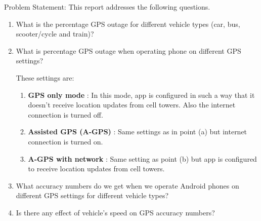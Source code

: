 \documentclass[12pt]{report}
\begin{document}
  



\noindent
Problem Statement: This report addresses the following questions.

\begin{enumerate}
\item \label{q1} What is the percentage GPS outage for different vehicle types
  (car, bus, scooter/cycle and train)?

\item What is percentage GPS outage when operating phone on different GPS
  settings?

  These settings are:
  \begin{enumerate}
  \item \textbf{GPS only mode} : In this mode, app is configured in such a way
    that it doesn't receive location updates from cell towers. Also the internet
    connection is turned off.
  \item \textbf{Assisted GPS (A-GPS)} : Same settings as in point (a) but
    internet connection is turned on.
  \item \textbf{A-GPS with network} : Same setting as point (b) but app is
    configured to receive location updates from cell towers.
  \end{enumerate}

\item What accuracy numbers do we get when we operate Android phones on
  different GPS settings for different vehicle types?
\item Is there any effect of vehicle's speed on GPS accuracy numbers?
\end{enumerate}

\end{document}
